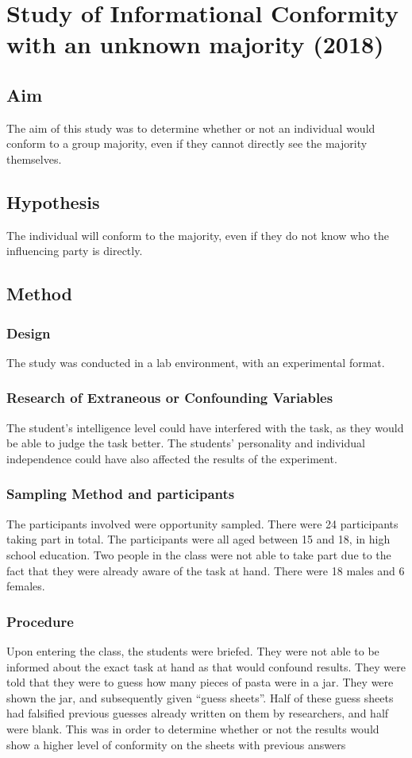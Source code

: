 \documentclass{report}
\begin{document}
\chapter{Study of Informational Conformity with an unknown majority (2018)}
\section {Aim}
The aim of this study was to determine whether or not an individual would conform to a group majority, even if they cannot directly see the majority themselves.
\section{Hypothesis}
The individual will conform to the majority, even if they do not know who the influencing party is directly.
\section {Method}
\subsection{Design}
The study was conducted in a lab environment, with an experimental format.
\subsection{Research of Extraneous or Confounding Variables}
The student’s intelligence level could have interfered with the task, as they would be able to judge the task better. The students’ personality and individual independence could have also affected the results of the experiment.
\subsection{Sampling Method and participants}
The participants involved were opportunity sampled. There were 24 participants taking part in total. The participants were all aged between 15 and 18, in high school education. Two people in the class were not able to take part due to the fact that they were already aware of the task at hand. There were 18 males and 6 females.
\subsection{Procedure}
Upon entering the class, the students were briefed. They were not able to be informed about the exact task at hand as that would confound results. They were told that they were to guess how many pieces of pasta were in a jar. They were shown the jar, and subsequently given “guess sheets”. Half of these guess sheets had falsified previous guesses already written on them by researchers, and half were blank. This was in order to determine whether or not the results would show a higher level of conformity on the sheets with previous answers
\begin{center}
\end{center}
\end{document}
